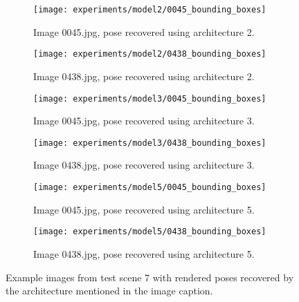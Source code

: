 \begin{appendices}
\begin{figure}[!tbp]
	\centering
	\vspace{5mm}
	\begin{subfigure}[t]{0.47\textwidth}
		\centering
    	\texttt{[image: experiments/model2/0045\_bounding\_boxes]}
    	\caption{Image 0045.jpg, pose recovered using architecture 2.}
	\end{subfigure}
	\hfill
	\begin{subfigure}[t]{0.47\textwidth}
		\centering
    	\texttt{[image: experiments/model2/0438\_bounding\_boxes]}
    	\caption{Image 0438.jpg, pose recovered using architecture 2.}
	\end{subfigure}
	\par\bigskip
	\begin{subfigure}[t]{0.47\textwidth}
		\centering
    	\texttt{[image: experiments/model3/0045\_bounding\_boxes]}
    	\caption{Image 0045.jpg, pose recovered using architecture 3.}
	\end{subfigure}
	\hfill
	\begin{subfigure}[t]{0.47\textwidth}
		\centering
    	\texttt{[image: experiments/model3/0438\_bounding\_boxes]}
    	\caption{Image 0438.jpg, pose recovered using architecture 3.}
	\end{subfigure}
	\par\bigskip
	\begin{subfigure}[t]{0.47\textwidth}
		\centering
    	\texttt{[image: experiments/model5/0045\_bounding\_boxes]}
    	\caption{Image 0045.jpg, pose recovered using architecture 5.}
	\end{subfigure}
	\hfill
	\begin{subfigure}[t]{0.47\textwidth}
		\centering
    	\texttt{[image: experiments/model5/0438\_bounding\_boxes]}
    	\caption{Image 0438.jpg, pose recovered using architecture 5.}
	\end{subfigure}
	\caption{Example images from test scene 7 with rendered poses recovered by the architecture mentioned in the image caption.}
	\label{fig:appendix_architecture_comparison_example_frames}
\end{figure}

\end{appendices}